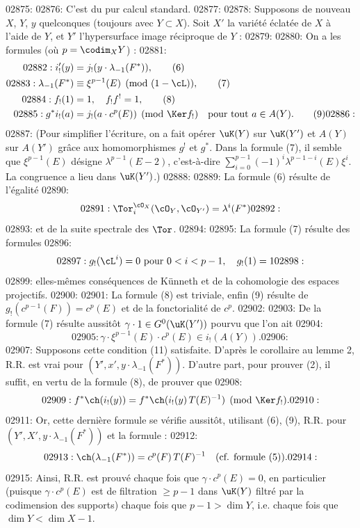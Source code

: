 02875: 
02876: C'est du pur calcul standard.
02877: 
02878: Supposons de nouveau $X$, $Y$, $y$ quelconques (toujours avec $Y \subset X$). Soit $X'$ la vari\'et\'e \'eclat\'ee de $X$ \`a l'aide de $Y$, et $Y'$ l'hypersurface image r\'eciproque de $Y$ :
02879: 
02880: On a les formules (o\`u $p = \codim_X Y$) :
02881: \begin{align}
02882: i'_!(y) &= j_!(y \cdot \lambda_{-1}(F^*)), \tag{6} \\
02883: \lambda_{-1}(F^*) &\equiv \xi^{p-1}(E) \pmod{(1 - \cL)}, \tag{7} \\
02884: f_!(1) &= 1, \quad f_! f^! = 1, \tag{8} \\
02885: g^* i_!(a) &= j_!(a \cdot c^p(E)) \pmod{\Ker f_!} \quad \text{pour tout } a \in A(Y). \tag{9}
02886: \end{align}
02887: (Pour simplifier l'\'ecriture, on a fait op\'erer $\uK(Y)$ sur $\uK(Y')$ et $A(Y)$ sur $A(Y')$ gr\^ace aux homomorphismes $g^!$ et $g^*$. Dans la formule (7), il semble que $\xi^{p-1}(E)$ d\'esigne $\lambda^{p-1}(E - 2)$, c'est-\`a-dire $\sum_{i=0}^{p-1} (-1)^i \lambda^{p-1-i}(E) \xi^i$. La congruence a lieu dans $\uK(Y')$.)
02888: 
02889: La formule (6) r\'esulte de l'\'egalit\'e
02890: \[
02891: \Tor_i^{\cO_X}(\cO_Y, \cO_{Y'}) = \lambda^i(F^*)
02892: \]
02893: et de la suite spectrale des $\Tor$.
02894: 
02895: La formule (7) r\'esulte des formules
02896: \[
02897: g_!(\cL^i) = 0 \text{ pour } 0 < i < p-1, \quad g_!(1) = 1
02898: \]
02899: elles-m\^emes cons\'equences de K\"unneth et de la cohomologie des espaces projectifs.
02900: 
02901: La formule (8) est triviale, enfin (9) r\'esulte de $g_!(c^{p-1}(F)) = c^p(E)$ et de la fonctorialit\'e de $c^p$.
02902: 
02903: De la formule (7) r\'esulte aussit\^ot $\gamma \cdot 1 \in G^0(\uK(Y'))$ pourvu que l'on ait
02904: \[
02905: \gamma \cdot \xi^{p-1}(E) \cdot c^p(E) \in i_!(A(Y)).
02906: \]
02907: Supposons cette condition (11) satisfaite. D'apr\`es le corollaire au lemme 2, R.R. est vrai pour $(Y', x', y \cdot \lambda_{-1}(F^*))$. D'autre part, pour prouver (2), il suffit, en vertu de la formule (8), de prouver que
02908: \[
02909: f^*\ch(i_!(y)) = f^*\ch(i_!(y)\,T(E)^{-1}) \pmod{\Ker f_!}.
02910: \]
02911: Or, cette derni\`ere formule se v\'erifie aussit\^ot, utilisant (6), (9), R.R. pour $(Y', X', y \cdot \lambda_{-1}(F^*))$ et la formule :
02912: \begin{equation}\label{eq:rr.13}
02913: \ch(\lambda_{-1}(F^*)) = c^p(F)\,T(F)^{-1} \quad \text{(cf. formule (5)).}
02914: \end{equation}
02915: Ainsi, R.R. est prouv\'e chaque fois que $\gamma \cdot c^p(E) = 0$, en particulier (puisque $\gamma \cdot c^p(E)$ est de filtration $\geq p-1$ dans $\uK(Y)$ filtr\'e par la codimension des supports) chaque fois que $p-1 > \dim Y$, i.e. chaque fois que $\dim Y < \dim X - 1$.
